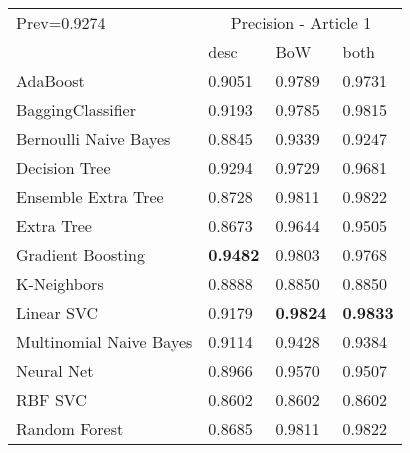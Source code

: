 \begin{tabular}{|l|l|l|l| }
\hline
Prev=0.9274 &  \multicolumn{3}{c|}{Precision - Article 1} \\
\cline{2-4} & desc & BoW & both \\ \hline
AdaBoost                & 0.9051 & 0.9789 & 0.9731\\
BaggingClassifier       & 0.9193 & 0.9785 & 0.9815\\
Bernoulli Naive Bayes   & 0.8845 & 0.9339 & 0.9247\\
Decision Tree           & 0.9294 & 0.9729 & 0.9681\\
Ensemble Extra Tree     & 0.8728 & 0.9811 & 0.9822\\
Extra Tree              & 0.8673 & 0.9644 & 0.9505\\
Gradient Boosting       & {\bf 0.9482} & 0.9803 & 0.9768\\
K-Neighbors             & 0.8888 & 0.8850 & 0.8850\\
Linear SVC              & 0.9179 & {\bf 0.9824} & {\bf 0.9833}\\
Multinomial Naive Bayes & 0.9114 & 0.9428 & 0.9384\\
Neural Net              & 0.8966 & 0.9570 & 0.9507\\
RBF SVC                 & 0.8602 & 0.8602 & 0.8602\\
Random Forest           & 0.8685 & 0.9811 & 0.9822\\
\hline
\end{tabular}